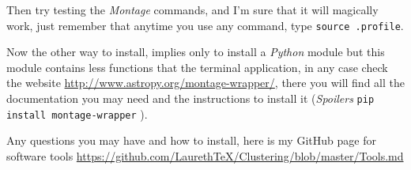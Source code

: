 \documentclass[11pt,fleqn]{book} %
\begin{document}
\begin{description}
\begin{enumerate}
\begin{verbatim}
																																																																																																																																																									           \end{verbatim}
																																																																																																																																																										              Then try testing the \emph{Montage} commands, and I'm sure that it will magically work, just remember that anytime you use any command, type \verb|source .profile|.\\
																																																																																																																																																											                  
																																																																																																																																																													      \end{enumerate}
																																																																																																																																																													          
																																																																																																																																																														      
																																																																																																																																																														          
																																																																																																																																																															        Now the other way to install, implies only to install a \emph{Python} module but this module contains less functions that the terminal application, in any case check the website \url{http://www.astropy.org/montage-wrapper/}, there you will find all the documentation you may need and the instructions to install it (\emph{Spoilers} \verb|pip install montage-wrapper| ).\\
																																																																																																																																																																\end{description}

																																																																																																																																																																Any questions you may have and how to install, here is my GitHub page for software tools \url{https://github.com/LaurethTeX/Clustering/blob/master/Tools.md}
\end{document}
